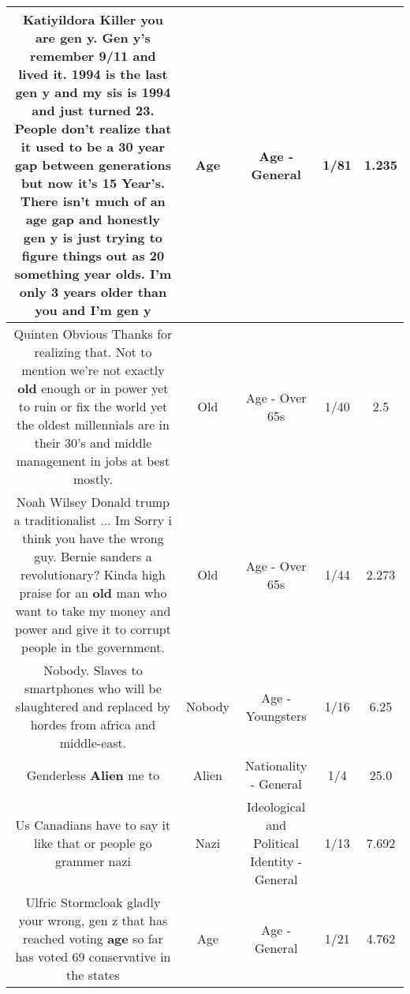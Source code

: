 \documentclass[11pt]{article}
\newlength\mylength
\begin{document}
\begin{center}
\begin{longtable}{|C{.65\mylength}|C{.30\mylength}|C{.12\mylength}|C{.12\mylength}|C{.12\mylength}|}
  \small Katiyildora Killer you are gen y. Gen y's remember 9/11 and lived it. 1994 is the last gen y and my sis is 1994 and just turned 23. People don't realize that it used to be a 30 year gap between generations but now it's 15 Year's. There isn't much of an \textbf{age} gap and honestly gen y is just trying to figure things out as 20 something year olds. I'm only 3 years older than you and I'm gen y\normalsize   & Age & Age - General & 1/81 & 1.235 \\  \hline
  \small Quinten Obvious Thanks for realizing that. Not to mention we're not exactly \textbf{old} enough or in power yet to ruin or fix the world yet the oldest millennials are in their 30's and middle management in jobs at best mostly.\normalsize   & Old & Age - Over 65s & 1/40 & 2.5 \\  \hline
  \small Noah Wilsey Donald trump a traditionalist ... Im Sorry i think you have the wrong guy. Bernie sanders a revolutionary? Kinda high praise for an \textbf{old} man who want to take my money and power and give it to corrupt people in the government.\normalsize   & Old & Age - Over 65s & 1/44 & 2.273 \\  \hline
  \small Nobody. Slaves to smartphones who will be slaughtered and replaced by hordes from africa and middle-east.\normalsize   & Nobody & Age - Youngsters & 1/16 & 6.25 \\  \hline
  \small Genderless \textbf{Alien} me to\normalsize   & Alien & Nationality - General & 1/4 & 25.0 \\  \hline
  \small Us Canadians have to say it like that or people go grammer nazi\normalsize   & Nazi &  Ideological and Political Identity - General & 1/13 & 7.692 \\  \hline
  \small Ulfric Stormcloak gladly your wrong, gen z that has reached voting \textbf{age} so far has voted 69 conservative in the states\normalsize   & Age & Age - General & 1/21 & 4.762 \\  \hline

\end{longtable}
\end{center}
\end{document}
